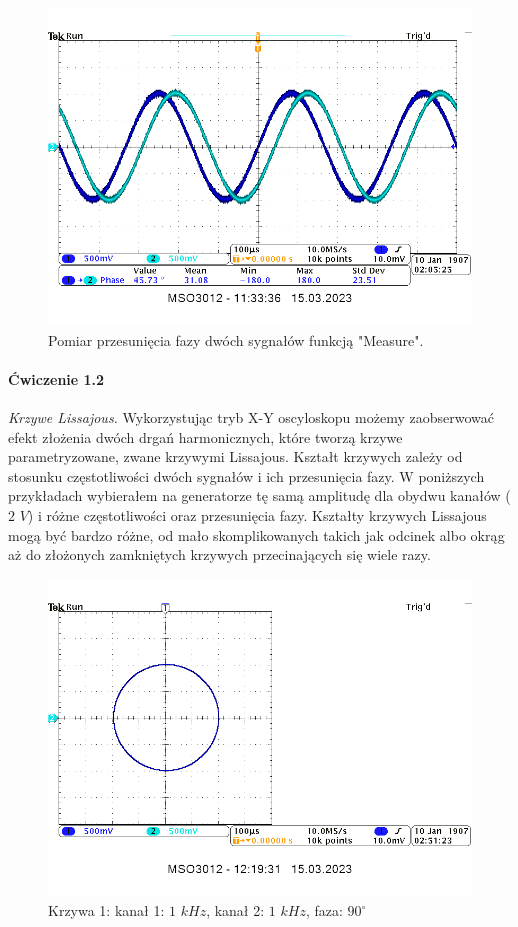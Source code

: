 \documentclass[14pt, table]{extarticle}
\begin{document}
\begin{figure}[H]
\includegraphics[scale=0.7]{A4}
\centering
\captionsetup{labelformat=empty}
\caption{Pomiar przesunięcia fazy dwóch sygnałów funkcją "Measure".}
\end{figure}

\newpage
\paragraph{Ćwiczenie 1.2 \\}
\textit{Krzywe Lissajous.} Wykorzystując tryb X-Y oscyloskopu możemy zaobserwować efekt złożenia dwóch drgań harmonicznych, które tworzą krzywe parametryzowane, zwane krzywymi Lissajous. Kształt krzywych zależy od stosunku częstotliwości dwóch sygnałów i ich przesunięcia fazy. W poniższych przykładach wybierałem na generatorze tę samą amplitudę dla obydwu kanałów ($2$ $V$) i różne częstotliwości oraz przesunięcia fazy. Kształty krzywych Lissajous mogą być bardzo różne, od mało skomplikowanych takich jak odcinek albo okrąg aż do złożonych zamkniętych krzywych przecinających się wiele razy.

\begin{figure}[H]
\includegraphics[scale=0.55]{A9}
\centering
\captionsetup{labelformat=empty}
\caption{Krzywa 1: kanał 1: $ 1$ $kHz$, kanał 2: $1 $ $kHz$, faza: $90^{\circ}$}
\end{figure}
\end{document}
